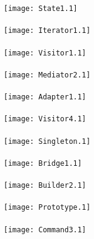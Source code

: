 \documentclass{article}
\begin{document}
\texttt{[image: State1.1]} \\ \vspace{2cm} \\
\texttt{[image: Iterator1.1]} \\ \vspace{2cm} \\
\texttt{[image: Visitor1.1]} \\ \vspace{2cm} \\
\texttt{[image: Mediator2.1]} \\ \vspace{2cm} \\
\texttt{[image: Adapter1.1]} \\ \vspace{2cm} \\
\texttt{[image: Visitor4.1]} \\ \vspace{2cm} \\
\texttt{[image: Singleton.1]} \\ \vspace{2cm} \\
\texttt{[image: Bridge1.1]} \\ \vspace{2cm} \\
\texttt{[image: Builder2.1]} \\ \vspace{2cm} \\
\texttt{[image: Prototype.1]} \\ \vspace{2cm} \\
\texttt{[image: Command3.1]} \\ \vspace{2cm} \\
\end{document}
